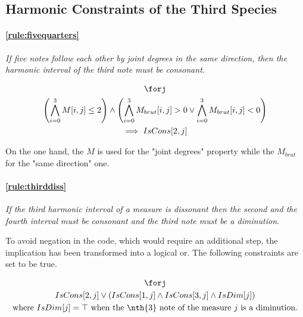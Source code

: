 \subsection{Harmonic Constraints of the Third Species}
\paragraph{\ref{rule:fivequarters}} \textit{If five notes follow each other by joint degrees in the same direction, then the harmonic interval of the third note must be consonant.}

\begin{equation}
    \begin{gathered}
        \forj\\
        \left(
            \bigwedge_{i=0}^{3} M[i, j] \leq 2
        \right)
        \land
        \left(
            \bigwedge_{i=0}^{3} M_{brut}[i, j] > 0
            \lor
            \bigwedge_{i=0}^{3} M_{brut}[i, j] < 0
        \right)\\
        \implies IsCons[2, j]
    \end{gathered}
\end{equation}

On the one hand, the $M$ is used for the "joint degrees" property while the $M_{brut}$ for the "same direction" one.

\paragraph{\ref{rule:thirddiss}} \textit{If the third harmonic interval of a measure is dissonant then the second and the fourth interval must be consonant and the third note must be a diminution.}

To avoid negation in the code, which would require an additional step, the implication has been transformed into a logical or. The following constraints are set to be true.

\begin{equation}
    \begin{gathered}
        \forj\\
        IsCons[2, j] \lor \left( IsCons[1, j] \land IsCons[3, j] \land IsDim[j]\right)\\
        \text{where } IsDim[j]=\top \text{ when the \nth{3} note of the measure } j \text{ is a diminution.}
    \end{gathered}
\end{equation}

